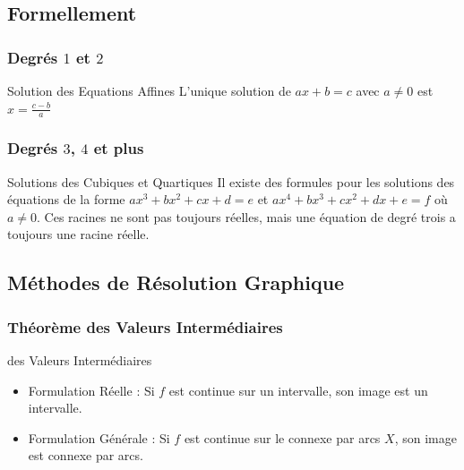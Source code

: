 \documentclass{beamercours}
\begin{document}
\subsection{Formellement}
\begin{frame}
\frametitle{Degrés $1$ et $2$}
\vspace{-5pt}
\begin{théorème}{Solution des Equations Affines}{}
L'unique solution de $ax + b = c$ avec $a \neq 0$ est $x = \frac{c - b}{a}$
\end{théorème}
\vspace{-8pt}
\end{frame}
\begin{frame}
\frametitle{Degrés $3$, $4$ et plus}
\begin{théorème}{Solutions des Cubiques et Quartiques}{}
Il existe des formules pour les solutions des équations de la forme $ax^{3} + bx^{2} + cx + d = e$ et $ax^{4} + bx^{3} + cx^{2} + dx + e = f$ où $a \neq 0$. Ces racines ne sont pas toujours réelles, mais une équation de degré trois a toujours une racine réelle.
\end{théorème}
\end{frame}

\subsection{Méthodes de Résolution Graphique}
\begin{frame}
\frametitle{Théorème des Valeurs Intermédiaires}
\begin{théorème}{des Valeurs Intermédiaires}{}
\begin{itemize}[<+->]
    \item Formulation Réelle : Si $f$ est continue sur un intervalle, son image est un intervalle.
    \item Formulation Générale : Si $f$ est continue sur le connexe par arcs $X$, son image est connexe par arcs.
\end{itemize}
\end{théorème}
\end{frame}
\end{document}
